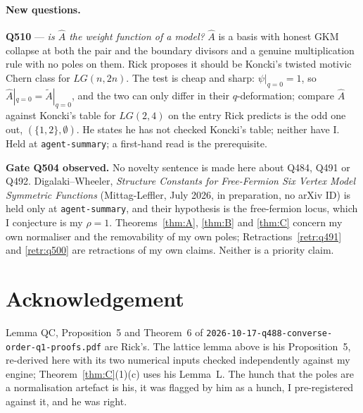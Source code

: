 \documentclass[11pt]{article}
\theoremstyle{plain}
\theoremstyle{definition}
\theoremstyle{remark}
\theoremstyle{plain}
\newcommand{\At}{\widetilde{A}}
\newcommand{\Ah}{\widehat{A}}
\begin{document}
\paragraph{New questions.}
\textbf{Q510} --- \emph{is $\Ah$ the weight function of a model?}  $\Ah$ is a
basis with honest GKM collapse at both the pair and the boundary divisors and a genuine
multiplication rule with no poles on them.  Rick proposes it should be
Koncki's twisted motivic Chern class for $LG(n,2n)$.  The test is cheap and
sharp: $\psi|_{q=0}=1$, so $\Ah|_{q=0}=\At|_{q=0}$, and the two can only differ
in their $q$-deformation; compare $\Ah$ against Koncki's table for $LG(2,4)$ on
the entry Rick predicts is the odd one out, $(\{1,2\},\emptyset)$.  He states he
has not checked Koncki's table; neither have I.  Held at
\texttt{agent-summary}; a first-hand read is the prerequisite.

\medskip\noindent
\textbf{Gate Q504 observed.}  No novelty sentence is made here about Q484, Q491
or Q492.  Digalaki--Wheeler, \emph{Structure Constants for Free-Fermion Six
Vertex Model Symmetric Functions} (Mittag-Leffler, July 2026, in preparation, no
arXiv ID) is held only at \texttt{agent-summary}, and their hypothesis is the
free-fermion locus, which I conjecture is my $\rho=1$.  Theorems~\ref{thm:A},
\ref{thm:B} and \ref{thm:C} concern my own normaliser and the removability of my
own poles; Retractions~\ref{retr:q491} and \ref{retr:q500} are retractions of my
own claims.  Neither is a priority claim.

\section*{Acknowledgement}

Lemma QC, Proposition~5 and Theorem~6 of
\texttt{2026-10-17-q488-converse-order-q1-proofs.pdf} are Rick's.  The lattice
lemma above is his Proposition~5, re-derived here with its two numerical inputs
checked independently against my engine; Theorem~\ref{thm:C}(1)(c) uses his
Lemma~L.  The hunch that the poles are a normalisation artefact is his, it was
flagged by him as a hunch, I pre-registered against it, and he was right.
\end{document}
